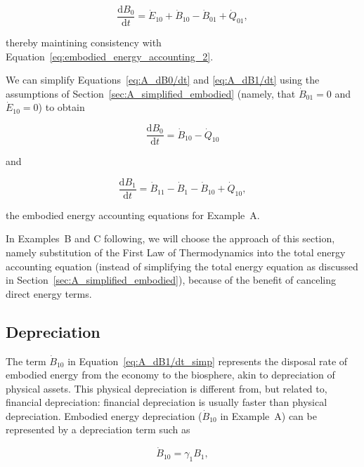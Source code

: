 \begin{equation} \label{eq:A_dB0/dt_waste_outflow}
	\frac{\mathrm{d}B_{0}}{\mathrm{d}t} 
	= \dot{E}_{10}
	+ \dot{B}_{10} 
	- \dot{B}_{01}
	+ \dot{Q}_{01},
\end{equation}

\noindent thereby maintining consistency with
Equation~\ref{eq:embodied_energy_accounting_2}.

We can simplify 
Equations~\ref{eq:A_dB0/dt} and \ref{eq:A_dB1/dt} 
using the assumptions of Section~\ref{sec:A_simplified_embodied} 
(namely, that $\dot{B}_{01} = 0$ and $\dot{E}_{10} = 0$)
to obtain

\begin{equation} \label{eq:A_dB0/dt_simp}
	\frac{\mathrm{d}B_{0}}{\mathrm{d}t} 
	= \dot{B}_{10} 
	- \dot{Q}_{10}
\end{equation}

\noindent and

\begin{equation} \label{eq:A_dB1/dt_simp}
	\frac{\mathrm{d}B_{1}}{\mathrm{d}t} 
	= \dot{B}_{11}
	- \dot{B}_{1}
	- \dot{B}_{10}
	+ \dot{Q}_{10},
\end{equation}

\noindent the embodied energy accounting equations for 
Example~A.

In Examples~B and C following, we will choose the approach of 
this section, namely substitution of the 
First Law of Thermodynamics into the total energy accounting equation
(instead of simplifying the total energy equation 
as discussed in Section~\ref{sec:A_simplified_embodied}),
because of the benefit of canceling direct energy terms. 



\subsection{Depreciation}

The term $\dot{B}_{10}$ in Equation~\ref{eq:A_dB1/dt_simp}
represents the disposal rate 
of embodied energy from the economy to the biosphere, 
akin to depreciation of physical assets. 
This physical depreciation is different from, 
but related to, financial depreciation: 
financial depreciation is usually faster than physical depreciation. 
Embodied energy depreciation ($\dot{B}_{10}$ in Example~A) 
can be represented by a depreciation term such as

\begin{equation} \label{eq:depreciation_term_defined}
	\dot{B}_{10} = \gamma_{1}B_{1},
\end{equation}

